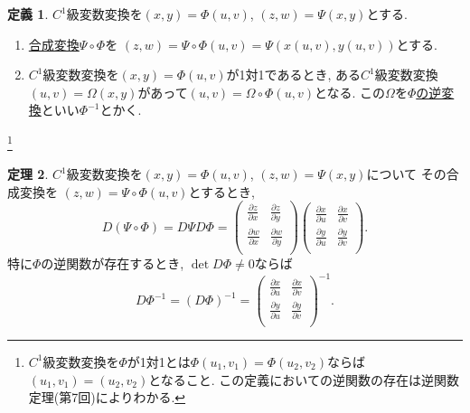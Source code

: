\documentclass[dvipdfmx,a4paper,11pt]{article}
\theoremstyle{definition}
\newtheorem{thm}{定理}
\newtheorem{dfn}[thm]{定義}
\newcommand{\pdrv}[2]{\frac{\partial #1}{\partial #2}}
\begin{document}
\begin{tcolorbox}[
    colback = white,
    colframe = green!35!black,
    fonttitle = \bfseries,
    breakable = true]
    \begin{dfn}
$C^1$級変数変換を$(x,y) = \Phi (u,v)$, $(z,w) = \Psi (x,y)$とする.

\begin{enumerate}

\item\underline{合成変換$\Psi \circ \Phi$}を
$(z,w) = \Psi \circ \Phi(u,v)=\Psi(x(u,v),y(u,v))$とする.

\item $C^1$級変数変換を$(x,y) = \Phi (u,v)$が1対1であるとき, ある$C^1$級変数変換$(u,v) = \Omega(x,y)$があって$(u,v) = \Omega\circ\Phi (u,v)$となる.
この$\Omega$を\underline{$\Phi $の逆変換}といい$\Phi^{-1}$とかく.
\end{enumerate}
    \end{dfn}
    \end{tcolorbox}
   \footnote{$C^1$級変数変換を$\Phi $が1対1とは$\Phi (u_1,v_1)=\Phi (u_2,v_2)$ならば$(u_1,v_1)=(u_2,v_2)$となること. この定義においての逆関数の存在は逆関数定理(第7回)によりわかる.}   


\begin{tcolorbox}[
    colback = white,
    colframe = green!35!black,
    fonttitle = \bfseries,
    breakable = true]
    \begin{thm}
$C^1$級変数変換を$(x,y) = \Phi (u,v)$, $(z,w) = \Psi (x,y)$について
その合成変換を
$(z,w) = \Psi \circ \Phi(u,v)$とするとき, 
$$
D (\Psi \circ \Phi)
= D \Psi D\Phi
=
\left(\begin{array}{cc} \pdrv{z}{x} & \pdrv{z}{y} \\ \pdrv{w}{x}& \pdrv{w}{y} \\ \end{array} \right)
\left(\begin{array}{cc} \pdrv{x}{u} & \pdrv{x}{v} \\ \pdrv{y}{u}& \pdrv{y}{v} \\ \end{array} \right).
$$
特に$\Phi $の逆関数が存在するとき, $\det D \Phi \neq 0$ならば
$$
D \Phi^{-1}
= (D\Phi)^{-1}
=
\left(\begin{array}{cc} \pdrv{x}{u} & \pdrv{x}{v} \\ \pdrv{y}{u}& \pdrv{y}{v} \\ \end{array} \right)^{-1}.
$$
    \end{thm}
    \end{tcolorbox}
    
\end{document}
